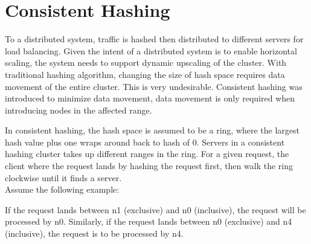 % 

\usetikzlibrary{arrows.meta} %

\chapter{Consistent Hashing}

To a distributed system, traffic is hashed then distributed to different servers
for load balancing. Given the intent of a distributed system is to enable
horizontal scaling, the system needs to support dynamic upscaling of the
cluster. With traditional hashing algorithm, changing the size of hash space
requires data movement of the entire cluster. This is very undesirable.
Consistent hashing was introduced to minimize data movement, data movement is
only required when introducing nodes in the affected range. 

\pagebreak

In consistent hashing, the hash space is assumed to be a ring, where the largest
hash value plus one wraps around back to hash of 0. Servers in a consistent hashing 
cluster takes up different ranges in the ring. For a given request, the client 
where the request lands by hashing the request first, then walk the ring clockwise 
until it finds a server. \\ 

Assume the following example:

\begin{center}
\end{center}

If the request lands between n1 (exclusive) and n0 (inclusive), the request will
be processed by n0. Similarly, if the request lands between n0 (exclusive) and
n4 (inclusive), the request is to be processed by n4.\\

